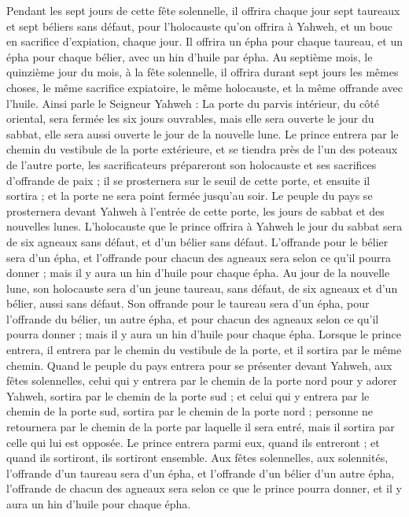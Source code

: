 \begin{multicols}{2}
Pendant les sept jours de cette fête solennelle, il offrira chaque jour sept taureaux et sept béliers sans défaut, pour l'holocauste qu'on offrira à Yahweh, et un bouc en sacrifice d’expiation, chaque jour.
Il offrira un épha pour chaque taureau, et un épha pour chaque bélier, avec un hin d'huile par épha.
Au septième mois, le quinzième jour du mois, à la fête solennelle, il offrira durant sept jours les mêmes choses, le même sacrifice expiatoire, le même holocauste, et la même offrande avec l'huile.
\VerseOne{}Ainsi parle le Seigneur Yahweh : La porte du parvis intérieur, du côté oriental, sera fermée les six jours ouvrables, mais elle sera ouverte le jour du sabbat, elle sera aussi ouverte le jour de la nouvelle lune.
Le prince entrera par le chemin du vestibule de la porte extérieure, et se tiendra près de l'un des poteaux de l'autre porte, les sacrificateurs prépareront son holocauste et ses sacrifices d’offrande de paix ; il se prosternera sur le seuil de cette porte, et ensuite il sortira ; et la porte ne sera point fermée jusqu’au soir.
Le peuple du pays se prosternera devant Yahweh à l'entrée de cette porte, les jours de sabbat et des nouvelles lunes.
L'holocauste que le prince offrira à Yahweh le jour du sabbat sera de six agneaux sans défaut, et d'un bélier sans défaut.
L’offrande pour le bélier sera d'un épha, et l’offrande pour chacun des agneaux sera selon ce qu'il pourra donner ; mais il y aura un hin d'huile pour chaque épha.
Au jour de la nouvelle lune, son holocauste sera d'un jeune taureau, sans défaut, de six agneaux et d'un bélier, aussi sans défaut.
Son offrande pour le taureau sera d’un épha, pour l’offrande du bélier, un autre épha, et pour chacun des agneaux selon ce qu'il pourra donner ; mais il y aura un hin d'huile pour chaque épha.
Lorsque le prince entrera, il entrera par le chemin du vestibule de la porte, et il sortira par le même chemin.
Quand le peuple du pays entrera pour se présenter devant Yahweh, aux fêtes solennelles, celui qui y entrera par le chemin de la porte nord pour y adorer Yahweh, sortira par le chemin de la porte sud ; et celui qui y entrera par le chemin de la porte sud, sortira par le chemin de la porte nord ; personne ne retournera par le chemin de la porte par laquelle il sera entré, mais il sortira par celle qui lui est opposée.
Le prince entrera parmi eux, quand ils entreront ; et quand ils sortiront, ils sortiront ensemble.
Aux fêtes solennelles, aux solennités, l’offrande d’un taureau sera d'un épha, et l’offrande d'un bélier d'un autre épha, l’offrande de chacun des agneaux sera selon ce que le prince pourra donner, et il y aura un hin d'huile pour chaque épha.

\end{multicols}
